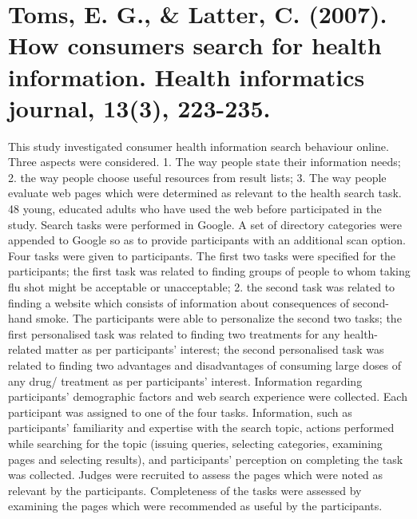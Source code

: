 \documentclass[]{article}
\begin{document}
\section{Toms, E. G., \& Latter, C. (2007). How consumers search for health information. Health informatics journal, 13(3), 223-235.}

This study investigated consumer health information search behaviour online. Three aspects were considered. 1. The way people state their information needs; 2. the way people choose useful resources from result lists; 3. The way people evaluate web pages which were determined as relevant to the health search task. 48 young, educated adults who have used the web before participated in the study. Search tasks were performed in Google. A set of directory categories were appended to Google so as to provide participants with an additional scan option. Four tasks were given to participants. The first two tasks were specified for the participants; the first task was related to finding groups of people to whom taking flu shot might be acceptable or unacceptable; 2. the second task was related to finding a website which consists of information about consequences of second-hand smoke. The participants were able to personalize the second two tasks; the first personalised task was related to finding two treatments for any health-related matter as per participants' interest; the second personalised task was related to finding two advantages and disadvantages of consuming large doses of any drug/ treatment as per participants' interest. Information regarding participants' demographic factors and web search experience were collected. Each participant was assigned to one of the four tasks. Information, such as participants' familiarity and expertise with the search topic, actions performed while searching for the topic (issuing queries, selecting categories, examining pages and selecting results), and participants' perception on completing the task was collected. Judges were recruited to assess the pages which were noted as relevant by the participants. Completeness of the tasks were assessed by examining the pages which were recommended as useful by the participants.
\end{document}
